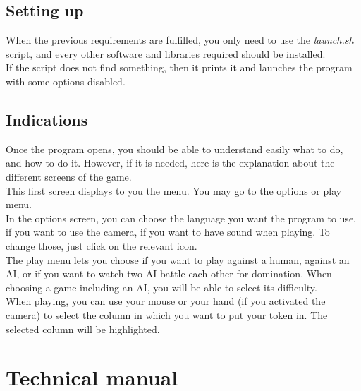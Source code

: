 \documentclass[11pt, a4paper, oneside]{report}
\begin{document}
	\section{Setting up}
	When the previous requirements are fulfilled, you only need to use the \textit{launch.sh} script, and every other software and libraries required should be installed. \\
	If the script does not find something, then it prints it and launches the program with some options disabled.

	\section{Indications}
	Once the program opens, you should be able to understand easily what to do, and how to do it. However, if it is needed, here is the explanation about the different screens of the game. \\

	This first screen displays to you the menu. You may go to the options or play menu. \\
	\hspace*{1cm} In the options screen, you can choose the language you want the program to use, if you want to use the camera, if you want to have sound when playing. To change those, just click on the relevant icon. \\
	\hspace*{1cm} The play menu lets you choose if you want to play against a human, against an AI, or if you want to watch two AI battle each other for domination. When choosing a game including an AI, you will be able to select its difficulty. \\

	When playing, you can use your mouse or your hand (if you activated the camera) to select the column in which you want to put your token in. The selected column will be highlighted.

	\chapter{Technical manual}
\end{document}
